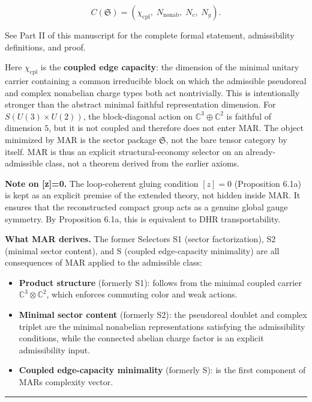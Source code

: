 \[C(\mathfrak S) = (\chi_{\mathrm{cpl}},\; N_{\mathrm{nonab}},\; N_c,\; N_g).\]

See Part II of this manuscript for the complete formal statement, admissibility definitions, and proof.

Here \(\chi_{\mathrm{cpl}}\) is the \textbf{coupled edge capacity}: the dimension of the minimal unitary carrier containing a common irreducible block on which the admissible pseudoreal and complex nonabelian charge types both act nontrivially. This is intentionally stronger than the abstract minimal faithful representation dimension. For \(S(U(3)\times U(2))\), the block-diagonal action on \(\mathbb{C}^3 \oplus \mathbb{C}^2\) is faithful of dimension \(5\), but it is not coupled and therefore does not enter MAR. The object minimized by MAR is the sector package \(\mathfrak S\), not the bare tensor category by itself. MAR is thus an explicit structural-economy selector on an already-admissible class, not a theorem derived from the earlier axioms.

\textbf{Note on {[}z{]}=0.} The loop-coherent gluing condition \([z]=0\) (Proposition 6.1a) is kept as an explicit premise of the extended theory, not hidden inside MAR. It ensures that the reconstructed compact group acts as a genuine global gauge symmetry. By Proposition 6.1a, this is equivalent to DHR transportability.

\textbf{What MAR derives.} The former Selectors S1 (sector factorization), S2 (minimal sector content), and S (coupled edge-capacity minimality) are all consequences of MAR applied to the admissible class:

\begin{itemize}
\tightlist
\item
  \textbf{Product structure} (formerly S1): follows from the minimal coupled carrier \(\mathbb{C}^3 \otimes \mathbb{C}^2\), which enforces commuting color and weak actions.
\item
  \textbf{Minimal sector content} (formerly S2): the pseudoreal doublet and complex triplet are the minimal nonabelian representations satisfying the admissibility conditions, while the connected abelian charge factor is an explicit admissibility input.
\item
  \textbf{Coupled edge-capacity minimality} (formerly S): is the first component of MAR\textquotesingle s complexity vector.
\end{itemize}

\begin{center}\rule{0.5\linewidth}{0.5pt}\end{center}

